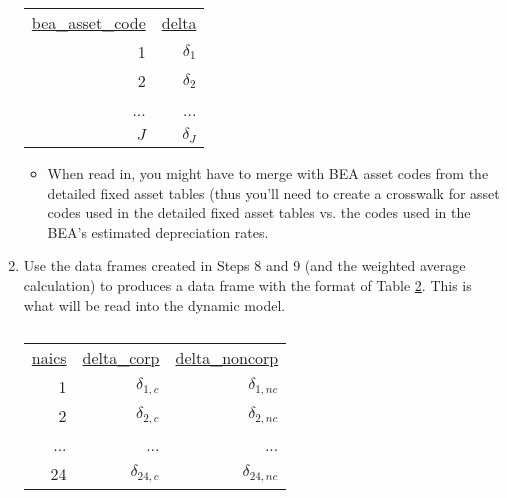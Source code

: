 \documentclass[a4paper]{article}
\begin{document}
\begin{enumerate}
\begin{table}[h!]
\begin{tabular}{rr}
    \underline{bea\_asset\_code} & \underline{delta} \\
    
    1     & $\delta_{1}$ \\
    2     & $\delta_{2}$ \\
    ...     & ...  \\
    $J$   & $\delta_{J}$ \\
    
    \end{tabular}%
  \label{tab:step8}%
\end{table}%


	\begin{itemize}
	\item When read in, you might have to merge with BEA asset codes from the detailed fixed asset tables (thus you'll need to create a crosswalk for asset codes used in the detailed fixed asset tables vs. the codes used in the BEA's estimated depreciation rates.
	\end{itemize}
\item Use the data frames created in Steps 8 and 9 (and the weighted average calculation) to produces a data frame with the format of Table \ref{tab:step9}.  This is what will be read into the dynamic model.
	
\begin{table}[h!]
  \centering
  \caption{}
    \begin{tabular}{rrr}

    \underline{naics} & \underline{delta\_corp} & \underline{delta\_noncorp} \\

    1     & $\delta_{1,c}$ & $\delta_{1,nc}$ \\
    2     & $\delta_{2,c}$ & $\delta_{2,nc}$ \\
    ...    & ...    & ... \\
    24    & $\delta_{24,c}$ & $\delta_{24,nc}$ \\

    \end{tabular}%
  \label{tab:step9}%
\end{table}%


\end{enumerate}
\end{document}
